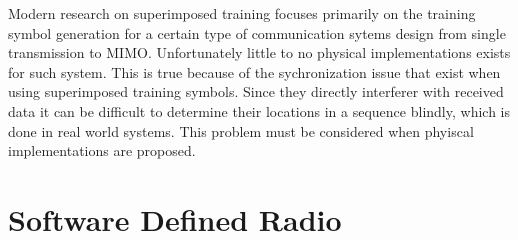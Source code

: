 \documentclass[11pt]{mvlthesis}
\begin{document}
Modern research on superimposed training focuses primarily on the training symbol generation for a certain type of communication sytems design from single transmission to MIMO.  Unfortunately little to no physical implementations exists for such system.  This is true because of the sychronization issue that exist when using superimposed training symbols.  Since they directly interferer with received data it can be difficult to determine their locations in a sequence blindly, which is done in real world systems.  This problem must be considered when phyiscal implementations are proposed.\\

\section{Software Defined Radio}













%


\end{document}
